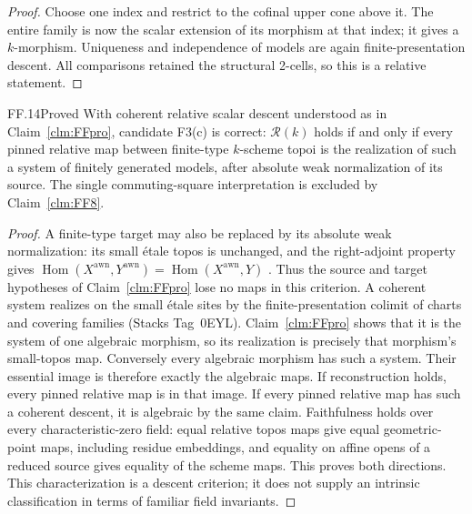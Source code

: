 \begin{proof}
Choose one index and restrict to the cofinal upper cone above it.
The entire family is now the scalar extension of its morphism
at that index; it gives a \(k\)-morphism. Uniqueness and
independence of models are again finite-presentation descent.
All comparisons retained the structural 2-cells, so this is a
relative statement.
\end{proof}

\begin{claim}{FF.14}{Proved}\label{clm:FFc}
With coherent relative scalar descent understood as in
Claim~\ref{clm:FFpro}, candidate F3(c) is correct:
\(\mathcal R(k)\) holds if and only if every pinned relative
map between finite-type \(k\)-scheme topoi is the realization
of such a system of finitely generated models, after absolute
weak normalization of its source. The single commuting-square
interpretation is excluded by Claim~\ref{clm:FF8}.
\end{claim}
\begin{proof}
A finite-type target may also be replaced by its absolute weak
normalization: its small \'etale topos is unchanged, and the
right-adjoint property gives
\(\operatorname{Hom}(X^{\mathrm{awn}},Y^{\mathrm{awn}})
 =\operatorname{Hom}(X^{\mathrm{awn}},Y)\)
\citep[Theorem~1.13]{FF_CHW2024}. Thus the source and target
hypotheses of Claim~\ref{clm:FFpro} lose no maps in this criterion.
A coherent system realizes on the small \'etale sites by the
finite-presentation colimit of charts and covering families
(Stacks Tag~0EYL). Claim~\ref{clm:FFpro} shows that it is the
system of one algebraic morphism, so its realization is precisely
that morphism's small-topos map. Conversely every algebraic
morphism has such a system. Their essential image is therefore
exactly the algebraic maps. If reconstruction holds, every pinned
relative map is in that image. If every pinned relative map has
such a coherent descent, it is algebraic by the same claim.
Faithfulness holds over every characteristic-zero field: equal
relative topos maps give equal geometric-point maps, including
residue embeddings, and equality on affine opens of a reduced
source gives equality of the scheme maps. This proves both
directions. This characterization is a descent criterion; it
does not supply an intrinsic classification in terms of familiar
field invariants.
\end{proof}


